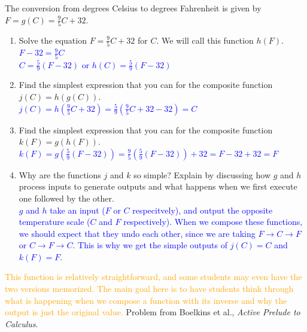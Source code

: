 \documentclass{ximera}
\begin{document}
\begin{exercise}
    The conversion from degrees Celsius to degrees Fahrenheit is given by $F=g(C)=\frac95 C+32$.
    \begin{enumerate}
        \item Solve the equation $F=\frac95C+32$ for $C$.  We will call this function $h(F)$.\\
        \textcolor{blue}{$F-32=\frac95 C$\\
        $C=\frac59(F-32)$ or $h(C)=\frac59(F-32)$}
        \item Find the simplest expression that you can for the composite function $j(C)=h(g(C))$.\\
        \textcolor{blue}{$j(C)=h(\frac95 C+32)=\frac59(\frac95 C+32-32)=C$}
        \item Find the simplest expression that you can for the composite function $k(F)=g(h(F))$.\\
        \textcolor{blue}{$k(F)=g(\frac59(F-32))=\frac95(\frac59(F-32))+32=F-32+32=F$}
        \item Why are the functions $j$ and $k$ so simple?  Explain by discussing how $g$ and $h$ process inputs to generate outputs and what happens when we first execute one followed by the other.\\
        \textcolor{blue}{$g$ and $h$ take an input ($F$ or $C$ respecitvely), and output the opposite temperature scale ($C$ and $F$ respectively).  When we compose these functions, we should expect that they undo each other, since we are taking $F\rightarrow C \rightarrow F$ or $C\rightarrow F \rightarrow C$.  This is why we get the simple outputs of $j(C)=C$ and $k(F)=F$.}
    \end{enumerate}
    \textcolor{orange}{This function is relatively straightforward, and some students may even have the two versions memorized.  The main goal here is to have students think through what is happening when we compose a function with its inverse and why the output is just the original value.}
    Problem from Boelkins et al., \textit{Active Prelude to Calculus}.
\end{exercise}
\end{document}
